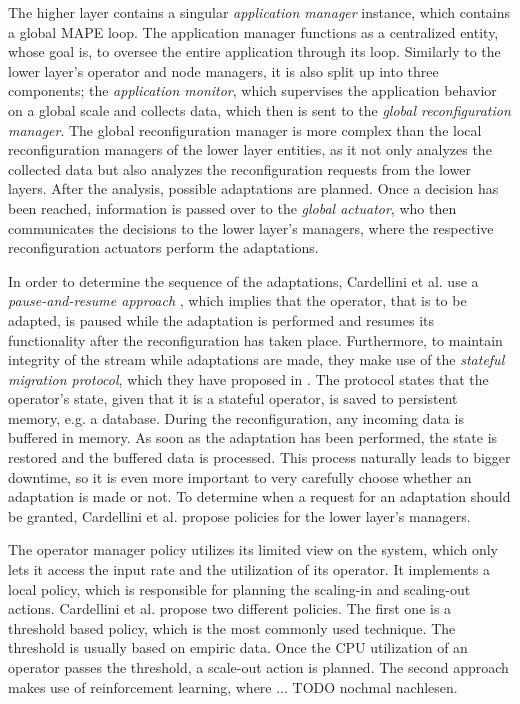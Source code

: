         \quad The higher layer contains a singular \textit{application manager} instance, which contains a global MAPE loop.
        The application manager functions as a centralized entity, whose goal is, to oversee the entire application through its loop.
        Similarly to the lower layer's operator and node managers, it is also split up into three components;
        the \textit{application monitor}, which supervises the application behavior on a global scale and collects data, which then is sent to the \textit{global reconfiguration manager}.
        The global reconfiguration manager is more complex than the local reconfiguration managers of the lower layer entities, as it not only analyzes the collected data but 
        also analyzes the reconfiguration requests from the lower layers. After the analysis, possible adaptations are planned.
        Once a decision has been reached, information is passed over to the \textit{global actuator}, who then communicates the decisions to the lower layer's managers, 
        where the respective reconfiguration actuators perform the adaptations.
        
        \quad In order to determine the sequence of the adaptations, Cardellini et al. use a \textit{pause-and-resume approach} \cite{Heinze2014CloudbasedDS}, 
        which implies that the operator, that is to be adapted, is paused while the adaptation is performed and resumes its functionality after the 
        reconfiguration has taken place. 
        Furthermore, to maintain integrity of the stream while adaptations are made, they make use of the \textit{stateful migration protocol}, 
        which they have proposed in \cite{migrationProtocol}. The protocol states that the operator's state, given that it is a stateful operator, 
        is saved to persistent memory, e.g. a database. During the reconfiguration, any incoming data is buffered in memory.
        As soon as the adaptation has been performed, the state is restored and the buffered data is processed.
        This process naturally leads to bigger downtime, so it is even more important to very carefully choose whether an adaptation is made or not.
        To determine when a request for an adaptation should be granted, Cardellini et al. propose policies for the lower layer's managers.

        \quad The operator manager policy utilizes its limited view on the system, which only lets it access the input rate and the utilization of its operator.
        It implements a local policy, which is responsible for planning the scaling-in and scaling-out actions. Cardellini et al. propose two different policies.
        The first one is a threshold based policy, which is the most commonly used technique. The threshold is usually based on empiric data. Once the CPU utilization 
        of an operator passes the threshold, a scale-out action is planned. 
        The second approach makes use of reinforcement learning, where ... {TODO nochmal nachlesen}.

